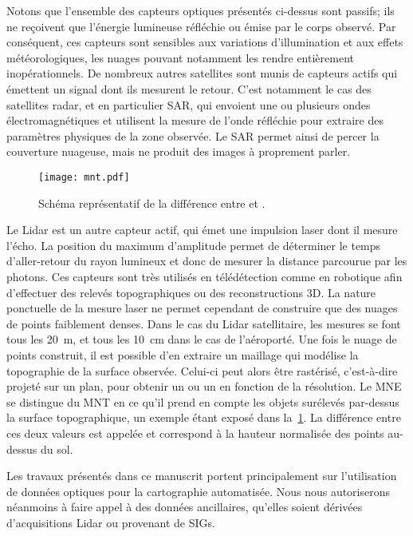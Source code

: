 Notons que l'ensemble des capteurs optiques présentés ci-dessus sont passifs; ils ne reçoivent que l'énergie lumineuse réfléchie ou émise par le corps observé. Par conséquent, ces capteurs sont sensibles aux variations d'illumination et aux effets météorologiques, les nuages pouvant notamment les rendre entièrement inopérationnels. De nombreux autres satellites sont munis de capteurs actifs qui émettent un signal dont ils mesurent le retour. C'est notamment le cas des satellites radar, et en particulier \gls{SAR}, qui envoient une ou plusieurs ondes électromagnétiques et utilisent la mesure de l'onde réfléchie pour extraire des paramètres physiques de la zone observée. Le \gls{SAR} permet ainsi de percer la couverture nuageuse, mais ne produit des images à proprement parler.

\begin{figure}
  \texttt{[image: mnt.pdf]}
  \caption{Schéma représentatif de la différence entre  et .}
  \label{fig:mnt}
\end{figure}

Le \gls{Lidar} est un autre capteur actif, qui émet une impulsion laser dont il mesure l'écho. La position du maximum d'amplitude permet de déterminer le temps d'aller-retour du rayon lumineux et donc de mesurer la distance parcourue par les photons. Ces capteurs sont très utilisés en télédétection comme en robotique afin d'effectuer des relevés topographiques ou des reconstructions 3D. La nature ponctuelle de la mesure laser ne permet cependant de construire que des nuages de points faiblement denses. Dans le cas du \gls{Lidar} satellitaire, les mesures se font tous les \SI{20}{\meter}, et tous les \SI{10}{\centi\meter} dans le cas de l'aéroporté. Une fois le nuage de points construit, il est possible d'en extraire un maillage qui modélise la topographie de la surface observée. Celui-ci peut alors être rastérisé, c'est-à-dire projeté sur un plan, pour obtenir un  ou un  en fonction de la résolution. Le \gls{MNE} se distingue du \gls{MNT} en ce qu'il prend en compte les objets surélevés par-dessus la surface topographique, un exemple étant exposé dans la~\cref{fig:mnt}. La différence entre ces deux valeurs est appelée  et correspond à la hauteur normalisée des points au-dessus du sol.

Les travaux présentés dans ce manuscrit portent principalement sur l'utilisation de données optiques pour la cartographie automatisée. Nous nous autoriserons néanmoins à faire appel à des données ancillaires, qu'elles soient dérivées d'acquisitions \gls{Lidar} ou provenant de \glspl{SIG}.

